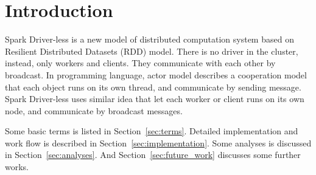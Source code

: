 
\section{Introduction} %
\label{sec:introduction}

Spark Driver-less is a new model of distributed computation system based on
Resilient Distributed Datasets (RDD)\cite{rdd} model.
There is no driver in the cluster, instead, only workers and clients.
They communicate with each other by broadcast.
In programming language, actor model describes a cooperation model that each object runs on its own thread,
and communicate by sending message.
Spark Driver-less uses similar idea that let each worker or client runs on its own node,
and communicate by broadcast messages.

Some basic terms is listed in Section~\ref{sec:terms}.
Detailed implementation and work flow is described in Section~\ref{sec:implementation}.
Some analyses is discussed in Section~\ref{sec:analyses}.
And Section~\ref{sec:future_work} discusses some further works.

